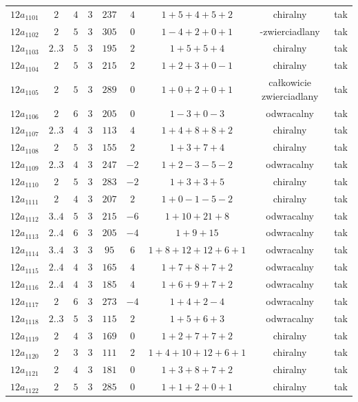 \begin{longtable}{ccccccccc}
$12a_{1101}$ & $2$ & $4$ & $3$ & $237$ & $4$ & $1+5+4+5+2$ & chiralny & tak \\
$12a_{1102}$ & $2$ & $5$ & $3$ & $305$ & $0$ & $1-4+2+0+1$ & -zwierciadlany & tak \\
$12a_{1103}$ & $2..3$ & $5$ & $3$ & $195$ & $2$ & $1+5+5+4$ & chiralny & tak \\
$12a_{1104}$ & $2$ & $5$ & $3$ & $215$ & $2$ & $1+2+3+0-1$ & chiralny & tak \\
$12a_{1105}$ & $2$ & $5$ & $3$ & $289$ & $0$ & $1+0+2+0+1$ & całkowicie zwierciadlany & tak \\
$12a_{1106}$ & $2$ & $6$ & $3$ & $205$ & $0$ & $1-3+0-3$ & odwracalny & tak \\
$12a_{1107}$ & $2..3$ & $4$ & $3$ & $113$ & $4$ & $1+4+8+8+2$ & chiralny & tak \\
$12a_{1108}$ & $2$ & $5$ & $3$ & $155$ & $2$ & $1+3+7+4$ & chiralny & tak \\
$12a_{1109}$ & $2..3$ & $4$ & $3$ & $247$ & $-2$ & $1+2-3-5-2$ & odwracalny & tak \\
$12a_{1110}$ & $2$ & $5$ & $3$ & $283$ & $-2$ & $1+3+3+5$ & chiralny & tak \\
$12a_{1111}$ & $2$ & $4$ & $3$ & $207$ & $2$ & $1+0-1-5-2$ & chiralny & tak \\
$12a_{1112}$ & $3..4$ & $5$ & $3$ & $215$ & $-6$ & $1+10+21+8$ & odwracalny & tak \\
$12a_{1113}$ & $2..4$ & $6$ & $3$ & $205$ & $-4$ & $1+9+15$ & odwracalny & tak \\
$12a_{1114}$ & $3..4$ & $3$ & $3$ & $95$ & $6$ & $1+8+12+12+6+1$ & odwracalny & tak \\
$12a_{1115}$ & $2..4$ & $4$ & $3$ & $165$ & $4$ & $1+7+8+7+2$ & odwracalny & tak \\
$12a_{1116}$ & $2..4$ & $4$ & $3$ & $185$ & $4$ & $1+6+9+7+2$ & odwracalny & tak \\
$12a_{1117}$ & $2$ & $6$ & $3$ & $273$ & $-4$ & $1+4+2-4$ & odwracalny & tak \\
$12a_{1118}$ & $2..3$ & $5$ & $3$ & $115$ & $2$ & $1+5+6+3$ & odwracalny & tak \\
$12a_{1119}$ & $2$ & $4$ & $3$ & $169$ & $0$ & $1+2+7+7+2$ & chiralny & tak \\
$12a_{1120}$ & $2$ & $3$ & $3$ & $111$ & $2$ & $1+4+10+12+6+1$ & chiralny & tak \\
$12a_{1121}$ & $2$ & $4$ & $3$ & $181$ & $0$ & $1+3+8+7+2$ & chiralny & tak \\
$12a_{1122}$ & $2$ & $5$ & $3$ & $285$ & $0$ & $1+1+2+0+1$ & chiralny & tak \\

\end{longtable}
